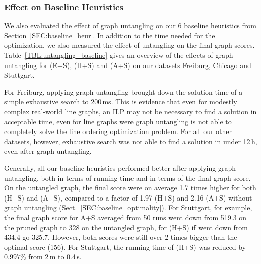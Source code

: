 \documentclass[format=acmsmall, review=false, screen=true]{acmart}
\begin{document}
\subsubsection{Effect on Baseline Heuristics}

We also evaluated the effect of graph untangling on our 6 baseline heuristics from Section~\ref{SEC:baseline_heur}. In addition to the time needed for the optimization, we also measured the effect of untangling on the final graph scores.
Table~\ref{TBL:untangling_baseline} gives an overview of the effects of graph untangling for (E+S), (H+S) and (A+S) on our datasets Freiburg, Chicago and Stuttgart.

For Freiburg, applying graph untangling brought down the solution time of a simple exhaustive search to 200\,ms.
This is evidence that even for modestly complex real-world line graphs, an ILP may not be necessary to find a solution in acceptable time, even for line graphs were graph untangling is not able to completely solve the line ordering optimization problem.
For all our other datasets, however, exhaustive search was not able to find a solution in under 12\,h, even after graph untangling.

Generally, all our baseline heuristics performed better after applying graph untangling, both in terms of running time and in terms of the final graph score. On the untangled graph, the final score were on average 1.7 times higher for both (H+S) and (A+S), compared to a factor of 1.97 (H+S) and 2.16 (A+S) without graph untangling (Sect.~\ref{SEC:baseline_optimality}). 
For Stuttgart, for example, the final graph score for A+S averaged from 50 runs went down from 519.3 on the pruned graph to 328 on the untangled graph, for (H+S) if went down from 434.4 go 325.7.
However, both scores were still over 2 times bigger than the optimal score (156).
For Stuttgart, the running time of (H+S) was reduced by $0.997\%$ from 2\,m to 0.4\,s.
\end{document}
